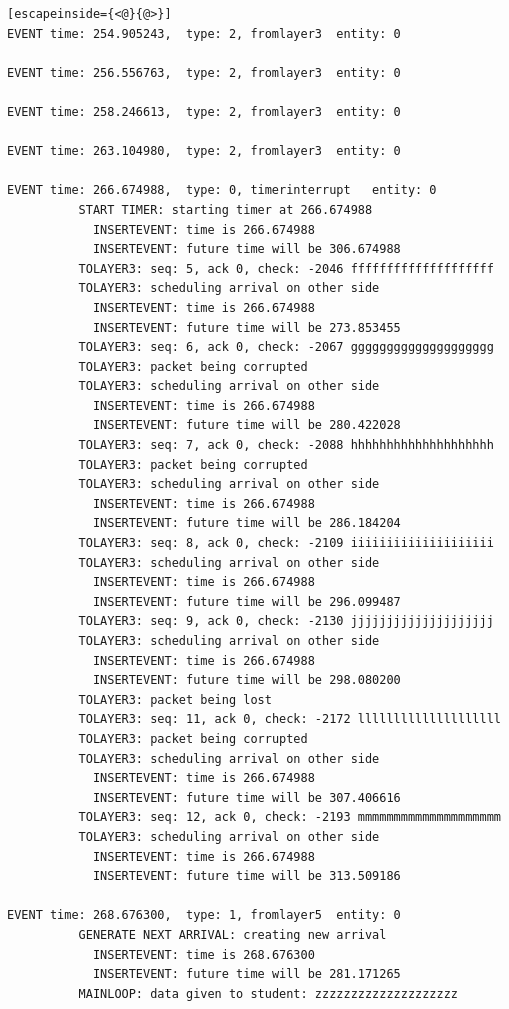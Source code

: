 \documentclass[paper=a4, fontsize=11pt]{scrartcl}
\numberwithin{equation}{section}		%
\numberwithin{figure}{section}			%
\numberwithin{table}{section}				%
\begin{document}
\begin{lstlisting}[escapeinside={<@}{@>}]
EVENT time: 254.905243,  type: 2, fromlayer3  entity: 0

EVENT time: 256.556763,  type: 2, fromlayer3  entity: 0

EVENT time: 258.246613,  type: 2, fromlayer3  entity: 0

EVENT time: 263.104980,  type: 2, fromlayer3  entity: 0

EVENT time: 266.674988,  type: 0, timerinterrupt   entity: 0
          START TIMER: starting timer at 266.674988
            INSERTEVENT: time is 266.674988
            INSERTEVENT: future time will be 306.674988
          TOLAYER3: seq: 5, ack 0, check: -2046 ffffffffffffffffffff
          TOLAYER3: scheduling arrival on other side
            INSERTEVENT: time is 266.674988
            INSERTEVENT: future time will be 273.853455
          TOLAYER3: seq: 6, ack 0, check: -2067 gggggggggggggggggggg
          TOLAYER3: packet being corrupted
          TOLAYER3: scheduling arrival on other side
            INSERTEVENT: time is 266.674988
            INSERTEVENT: future time will be 280.422028
          TOLAYER3: seq: 7, ack 0, check: -2088 hhhhhhhhhhhhhhhhhhhh
          TOLAYER3: packet being corrupted
          TOLAYER3: scheduling arrival on other side
            INSERTEVENT: time is 266.674988
            INSERTEVENT: future time will be 286.184204
          TOLAYER3: seq: 8, ack 0, check: -2109 iiiiiiiiiiiiiiiiiiii
          TOLAYER3: scheduling arrival on other side
            INSERTEVENT: time is 266.674988
            INSERTEVENT: future time will be 296.099487
          TOLAYER3: seq: 9, ack 0, check: -2130 jjjjjjjjjjjjjjjjjjjj
          TOLAYER3: scheduling arrival on other side
            INSERTEVENT: time is 266.674988
            INSERTEVENT: future time will be 298.080200
          TOLAYER3: packet being lost
          TOLAYER3: seq: 11, ack 0, check: -2172 llllllllllllllllllll
          TOLAYER3: packet being corrupted
          TOLAYER3: scheduling arrival on other side
            INSERTEVENT: time is 266.674988
            INSERTEVENT: future time will be 307.406616
          TOLAYER3: seq: 12, ack 0, check: -2193 mmmmmmmmmmmmmmmmmmmm
          TOLAYER3: scheduling arrival on other side
            INSERTEVENT: time is 266.674988
            INSERTEVENT: future time will be 313.509186

EVENT time: 268.676300,  type: 1, fromlayer5  entity: 0
          GENERATE NEXT ARRIVAL: creating new arrival
            INSERTEVENT: time is 268.676300
            INSERTEVENT: future time will be 281.171265
          MAINLOOP: data given to student: zzzzzzzzzzzzzzzzzzzz


\end{lstlisting}
\end{document}
